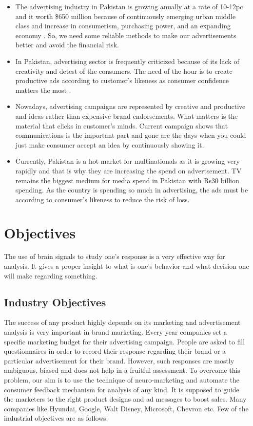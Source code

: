 \documentclass[a4paper, 12pt, oneside]{uet_thesis}
\begin{document}
\begin{itemize}
\item The advertising industry in Pakistan is growing anually at a rate of 10-12pc and it worth \$650 million because of continuously emerging urban middle class and increase in consumerism, purchasing power, and an expanding economy \cite{b2}. So, we need some reliable methods to make our advertisements better and avoid the financial risk. 
\item In Pakistan, advertising sector is frequently criticized because of its lack of creativity and detest of the consumers. The need of the hour is to create productive ads according to customer’s likeness as consumer confidence matters the most \cite{b4}.
\item Nowadays, advertising campaigns are represented by creative and productive and ideas rather than expensive brand endorsements. What matters is the material that clicks in customer's minds. Current campaign shows that communications is the important part and gone are the days when you could just make consumer accept an idea by continuously showing it. 
\item Currently, Pakistan is a hot  market for multinationals as it is growing very rapidly and that is why they are increasing the spend on advertsement. TV remains the biggest medium for media spend in Pakistan with Rs30 billion spending. As the country is spending so much in advertising, the ads must be according to consumer’s likeness to reduce the risk of loss.
\end{itemize}
\newpage
\chapter{Objectives}
The use of brain signals to study one’s response is a very effective way for analysis. It gives a proper insight to what is one’s behavior and what decision one will make regarding something. 

\section{Industry Objectives}
The success of any product highly depends on its marketing and advertisement analysis is very important in brand marketing. Every year companies set a specific marketing budget for their advertising campaign. People are asked to fill questionnaires in order to record their response regarding their brand or a particular advertisement for their brand. However, such responses are mostly ambiguous, biased and does not help in a fruitful assessment. To overcome this problem, our aim is to use the technique of neuro-marketing and automate the consumer feedback mechanism for analysis of any kind\cite{b6}. It is supposed to guide the marketers to the right product designs and ad messages to boost sales. Many companies like Hyundai, Google, Walt Disney, Microsoft, Chevron etc\cite{b5}. Few of the industrial objectives are as follows:
\end{document}

